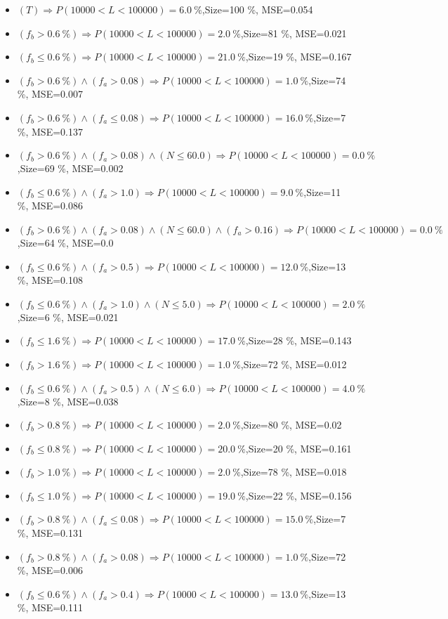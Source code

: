 \documentclass[numbered]{CSL}
\begin{document}
\begin{itemize}
\item $(T) \Rightarrow P(10 000 < L < 100 000) = 6.0~\%$,\hfill Size=100 \%, MSE=0.054
\item $(f_b > 0.6~\%) \Rightarrow P(10 000 < L < 100 000) = 2.0~\%$,\hfill Size=81 \%, MSE=0.021
\item $(f_b \leq 0.6~\%) \Rightarrow P(10 000 < L < 100 000) = 21.0~\%$,\hfill Size=19 \%, MSE=0.167
\item $(f_b > 0.6~\%) \land (f_a > 0.08) \Rightarrow P(10 000 < L < 100 000) = 1.0~\%$,\hfill Size=74 \%, MSE=0.007
\item $(f_b > 0.6~\%) \land (f_a \leq 0.08) \Rightarrow P(10 000 < L < 100 000) = 16.0~\%$,\hfill Size=7 \%, MSE=0.137
\item $(f_b > 0.6~\%) \land (f_a > 0.08) \land (N \leq 60.0) \Rightarrow P(10 000 < L < 100 000) = 0.0~\%$,\hfill Size=69 \%, MSE=0.002
\item $(f_b \leq 0.6~\%) \land (f_a > 1.0) \Rightarrow P(10 000 < L < 100 000) = 9.0~\%$,\hfill Size=11 \%, MSE=0.086
\item $(f_b > 0.6~\%) \land (f_a > 0.08) \land (N \leq 60.0) \land (f_a > 0.16) \Rightarrow P(10 000 < L < 100 000) = 0.0~\%$,\hfill Size=64 \%, MSE=0.0
\item $(f_b \leq 0.6~\%) \land (f_a > 0.5) \Rightarrow P(10 000 < L < 100 000) = 12.0~\%$,\hfill Size=13 \%, MSE=0.108
\item $(f_b \leq 0.6~\%) \land (f_a > 1.0) \land (N \leq 5.0) \Rightarrow P(10 000 < L < 100 000) = 2.0~\%$,\hfill Size=6 \%, MSE=0.021
\item $(f_b \leq 1.6~\%) \Rightarrow P(10 000 < L < 100 000) = 17.0~\%$,\hfill Size=28 \%, MSE=0.143
\item $(f_b > 1.6~\%) \Rightarrow P(10 000 < L < 100 000) = 1.0~\%$,\hfill Size=72 \%, MSE=0.012
\item $(f_b \leq 0.6~\%) \land (f_a > 0.5) \land (N \leq 6.0) \Rightarrow P(10 000 < L < 100 000) = 4.0~\%$,\hfill Size=8 \%, MSE=0.038
\item $(f_b > 0.8~\%) \Rightarrow P(10 000 < L < 100 000) = 2.0~\%$,\hfill Size=80 \%, MSE=0.02
\item $(f_b \leq 0.8~\%) \Rightarrow P(10 000 < L < 100 000) = 20.0~\%$,\hfill Size=20 \%, MSE=0.161
\item $(f_b > 1.0~\%) \Rightarrow P(10 000 < L < 100 000) = 2.0~\%$,\hfill Size=78 \%, MSE=0.018
\item $(f_b \leq 1.0~\%) \Rightarrow P(10 000 < L < 100 000) = 19.0~\%$,\hfill Size=22 \%, MSE=0.156
\item $(f_b > 0.8~\%) \land (f_a \leq 0.08) \Rightarrow P(10 000 < L < 100 000) = 15.0~\%$,\hfill Size=7 \%, MSE=0.131
\item $(f_b > 0.8~\%) \land (f_a > 0.08) \Rightarrow P(10 000 < L < 100 000) = 1.0~\%$,\hfill Size=72 \%, MSE=0.006
\item $(f_b \leq 0.6~\%) \land (f_a > 0.4) \Rightarrow P(10 000 < L < 100 000) = 13.0~\%$,\hfill Size=13 \%, MSE=0.111
\end{itemize}
\end{document}
